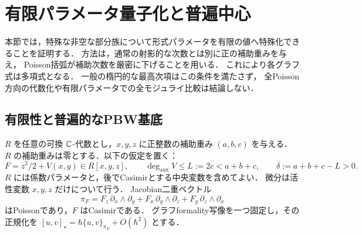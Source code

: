 \section{有限パラメータ量子化と普遍中心}
\label{sec:finite-auxiliary-quantization}

本節では，特殊な非空な部分族について形式パラメータを有限の値へ特殊化できることを証明する．
方法は，通常の射影的な次数とは別に正の補助重みを与え，
Poisson括弧が補助次数を厳密に下げることを用いる．
これにより各グラフ式は多項式となる．
一般の楕円的な最高次項はこの条件を満たさず，
全Poisson方向の代数化や有限パラメータでの全モジュライ比較は結論しない．

\subsection{有限性と普遍的なPBW基底}

$R$ を任意の可換 $\mathbb C$-代数とし，$x,y,z$ に正整数の補助重み $(a,b,c)$ を与える．
$R$ の補助重みは零とする．以下の仮定を置く：
\begin{equation}
 F=z^2/2+V(x,y)\in R[x,y,z],\qquad
 \deg_{\mathrm{aux}}V\le L:=2c<a+b+c,
 \qquad \delta:=a+b+c-L>0.
 \label{eq:negative-auxiliary-hypothesis}
\end{equation}
$R$ には係数パラメータと，後でCasimirとする中央変数を含めてよい．
微分は活性変数 $x,y,z$ だけについて行う．
Jacobian二重ベクトル
\begin{equation}
 \pi_F=F_z\,\partial_x\wedge\partial_y
       +F_x\,\partial_y\wedge\partial_z
       +F_y\,\partial_z\wedge\partial_x
 \label{eq:finite-jacobian-bivector}
\end{equation}
はPoissonであり，$F$ はCasimirである．
グラフformality写像を一つ固定し，その正規化を
$[u,v]_{\star}=\hbar\{u,v\}_{\pi_F}+O(\hbar^2)$ とする．

